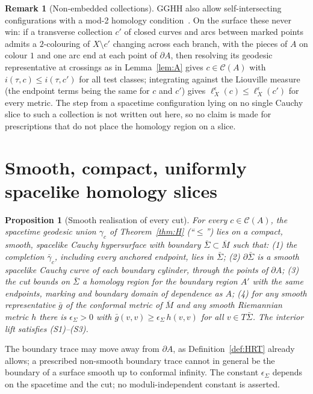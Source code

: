\documentclass[aps,prd,onecolumn,superscriptaddress,nofootinbib,amsmath,amssymb,11pt]{revtex4-2}
\newtheorem{proposition}[theorem]{Proposition}
\theoremstyle{definition}
\newtheorem{remark}[theorem]{Remark}
\newcommand{\Cut}{\mathcal{C}}
\newcommand{\eps}{\epsilon}
\newcommand{\Mbar}{\overline{M}}
\begin{document}
\begin{remark}[Non-embedded collections]\label{rem:nonembedded}
GGHH also allow self-intersecting configurations with a mod-2 homology condition~\cite{GGHH2025}. On the surface these never
win: if a transverse collection $c'$ of closed curves and arcs between marked points admits a $2$-colouring of $X\setminus c'$
changing across each branch, with the pieces of $A$ on colour $1$ and one arc end at each point of $\partial A$, then resolving
its geodesic representative at crossings as in Lemma~\ref{lem:A} gives $c\in\Cut(A)$ with $i(\tau,c)\le i(\tau,c')$ for all test
classes; integrating against the Liouville measure (the endpoint terms being the same for $c$ and $c'$) gives
$\ell^\eps_X(c)\le\ell^\eps_X(c')$ for every metric. The step from a spacetime configuration lying
on no single Cauchy slice to such a collection is not written out here, so no claim is made for prescriptions that do not place
the homology region on a slice.
\end{remark}
\section{Smooth, compact, uniformly spacelike homology slices}\label{sec:smooth}

\begin{proposition}[Smooth realisation of every cut]\label{prop:Splus}
For every $c\in\Cut(A)$, the spacetime geodesic union $\gamma_c$ of Theorem~\ref{thm:H} (``$\le$'') lies on a compact, smooth,
spacelike Cauchy hypersurface with boundary $\bar\Sigma\subset\Mbar$ such that: (1) the completion $\bar\gamma_c$, including every
anchored endpoint, lies in $\bar\Sigma$; (2) $\partial\bar\Sigma$ is a smooth spacelike Cauchy curve of each boundary cylinder,
through the points of $\partial A$; (3) the cut bounds on $\bar\Sigma$ a homology region for the boundary region $A'$ with the same
endpoints, marking and boundary domain of dependence as $A$; (4) for any smooth representative $\bar g$ of the conformal metric
of $\Mbar$ and any smooth Riemannian metric $h$ there is $\epsilon_\Sigma>0$ with $\bar g(v,v)\ge\epsilon_\Sigma\,h(v,v)$ for all
$v\in T\bar\Sigma$. The interior lift satisfies (S1)--(S3).
\end{proposition}

The boundary trace may move away from $\partial A$, as Definition~\ref{def:HRT} already allows; a prescribed non-smooth
boundary trace cannot in general be the boundary of a surface smooth up to conformal infinity. The constant $\epsilon_\Sigma$
depends on the spacetime and the cut; no moduli-independent constant is asserted.
\end{document}
